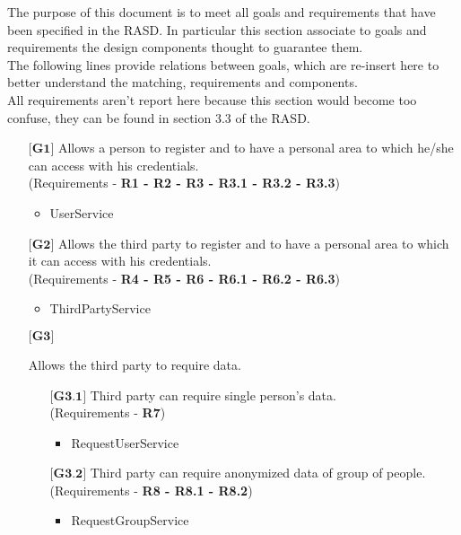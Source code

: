 The purpose of this document is to meet all goals and requirements that have been specified in the RASD. In particular this section associate to goals and requirements the design components thought to guarantee them.\\
The following lines provide relations between goals, which are re-insert here to better understand the matching, requirements and components.\\
All requirements aren't report here because this section would become too confuse, they can be found in section 3.3 of the RASD.

\begin{itemize}
	\item[${\textbf{[G1]}}$] {Allows a person to register and to have a personal area to which he/she can access with his 				credentials.\\(Requirements - \textbf{R1 - R2 - R3 - R3.1 - R3.2 - R3.3})}
		\begin{itemize}
			\item UserService	
		\end{itemize}
	\item[${\textbf{[G2]}}$] {Allows the third party to register and to have a personal area to which it can access with his 				credentials.\\(Requirements - \textbf{R4 - R5 - R6 - R6.1 - R6.2 - R6.3})}
		\begin{itemize}
			\item ThirdPartyService	
		\end{itemize}
	\item[${\textbf{[G3]}}$] {Allows the third party to require data.
				\begin{itemize}
					\item[${\textbf{[G3.1]}}$] {Third party can require single person's data.\\(Requirements - 								\textbf{R7})}
					\begin{itemize}
						\item RequestUserService	
					\end{itemize}
					\item[${\textbf{[G3.2]}}$] {Third party can require anonymized data of group of people.\\ 								(Requirements - \textbf{R8 - R8.1 - R8.2})}
					\begin{itemize}
						\item RequestGroupService	
					\end{itemize}
				\end{itemize}}

\end{itemize}
